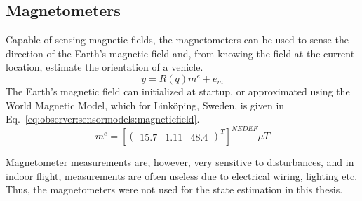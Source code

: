     \subsection{Magnetometers}
        Capable of sensing magnetic fields, the magnetometers can be used to
        sense the direction of the Earth's magnetic field and, from knowing
        the field at the current location, estimate the orientation of a vehicle.
        \begin{equation}
            y = R(q) m^{e} + e_{m}
        \end{equation}
        The Earth's magnetic field can initialized at startup, or approximated using the World Magnetic Model\cite{wmm2010},
        which for Linköping, Sweden, is given in Eq.~\eqref{eq:observer:sensormodels:magneticfield}.
        \begin{equation}
            \label{eq:observer:sensormodels:magneticfield}
            m^{e} = \left[\left(\begin{array}{ccc}
                15.7 & 1.11 & 48.4
            \end{array}\right)^{T}\right]^{NEDEF} \mu T
        \end{equation}

        Magnetometer measurements are, however, very sensitive to disturbances, and in indoor
        flight, measurements are often useless due to electrical wiring, lighting etc.
        Thus, the magnetometers were not used for the state estimation in this thesis.

